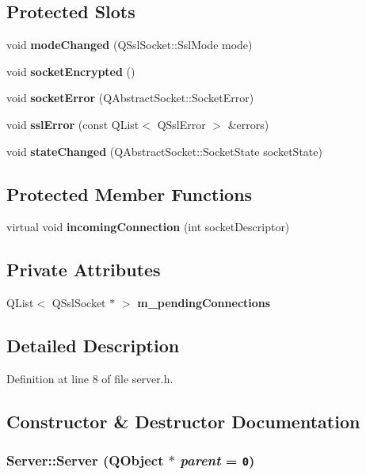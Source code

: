 \subsection*{Protected Slots}
\begin{CompactItemize}
\item 
void {\bf modeChanged} (QSslSocket::SslMode mode)
\item 
void {\bf socketEncrypted} ()
\item 
void {\bf socketError} (QAbstractSocket::SocketError)
\item 
void {\bf sslError} (const QList$<$ QSslError $>$ \&errors)
\item 
void {\bf stateChanged} (QAbstractSocket::SocketState socketState)
\end{CompactItemize}
\subsection*{Protected Member Functions}
\begin{CompactItemize}
\item 
virtual void {\bf incomingConnection} (int socketDescriptor)
\end{CompactItemize}
\subsection*{Private Attributes}
\begin{CompactItemize}
\item 
QList$<$ QSslSocket $\ast$ $>$ {\bf m\_\-pendingConnections}
\end{CompactItemize}


\subsection{Detailed Description}


Definition at line 8 of file server.h.

\subsection{Constructor \& Destructor Documentation}
\subsubsection{\setlength{\rightskip}{0pt plus 5cm}Server::Server ({\bf QObject} $\ast$ {\em parent} = {\tt 0})}\label{classServer_1950ac036d86af898428d7ba39bbf048}




